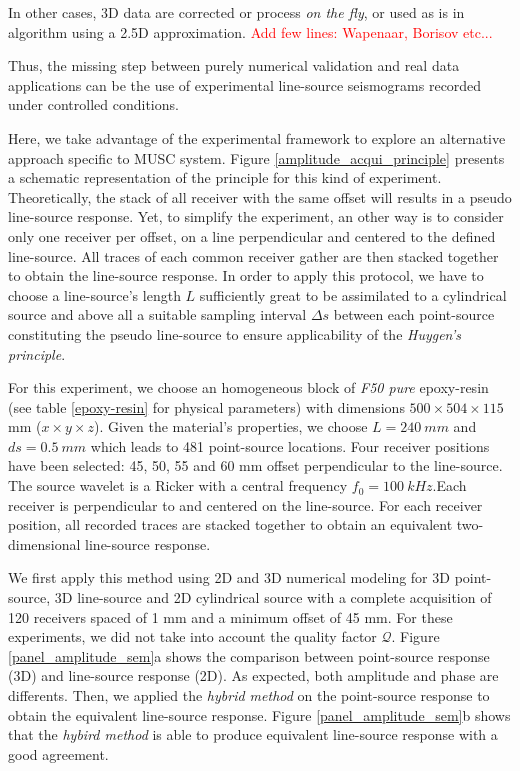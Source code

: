 \documentclass[manuscript,revised]{geophysics}
\begin{document}
\noindent In other cases, 3D data are corrected or process \textit{on the fly}, or used as is in algorithm using a 2.5D approximation. \textcolor{red}{Add few lines: Wapenaar, Borisov etc...}

\noindent Thus, the missing step between purely numerical validation and real data applications can be the use of experimental line-source seismograms recorded under controlled conditions.

\noindent Here, we take advantage of the experimental framework to explore an alternative approach specific to MUSC system. Figure \ref{amplitude_acqui_principle} presents a schematic representation of the principle for this kind of experiment. Theoretically, the stack of all receiver with the same offset will results in a pseudo line-source response. Yet, to simplify the experiment, an other way is to consider only one receiver per offset, on a line perpendicular  and centered to the defined line-source. All traces of each common receiver gather are then stacked together to obtain the line-source response. In order to apply this protocol, we have to choose a line-source's length $L$ sufficiently great to be assimilated to a cylindrical source and above all a suitable sampling interval $\Delta s$ between each point-source constituting the pseudo line-source to ensure applicability of the \textit{Huygen's principle}. 

\noindent For this experiment, we choose an homogeneous block of \textit{F50 pure} epoxy-resin (see table \ref{epoxy-resin} for physical parameters) with dimensions $500 \times 504 \times 115$ mm ($x \times y \times z$). Given the material's properties, we choose $L=240\ mm$ and $ds=0.5\ mm$ which leads to 481 point-source locations. Four receiver positions have been selected: 45, 50, 55 and 60 mm offset perpendicular to the line-source. The source wavelet is a Ricker with a central frequency $f_{0}=100\ kHz$.Each receiver is perpendicular to and centered on the line-source. For each receiver position, all recorded traces are stacked together to obtain an equivalent two-dimensional line-source response.

\noindent We first apply this method using 2D and 3D numerical modeling for 3D point-source, 3D line-source and 2D cylindrical source with a complete acquisition of 120 receivers spaced of 1 mm and a minimum offset of 45 mm. For these experiments, we did not take into account the quality factor $\mathcal{Q}$. Figure \ref{panel_amplitude_sem}a shows the comparison between point-source response (3D) and line-source response (2D). As expected, both amplitude and phase are differents. Then, we applied the \textit{hybrid method} \citep{Forbriger_LSS_2014;Schafer_LSS_2014} on the point-source response to obtain the equivalent line-source response. Figure \ref{panel_amplitude_sem}b shows that the \textit{hybird method} is able to produce equivalent line-source response with a good agreement.
\end{document}
